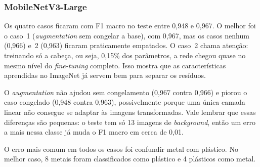\subsubsection{MobileNetV3-Large}

Os quatro casos ficaram com F1 macro no teste entre 0,948 e 0,967. O melhor
foi o caso~1 (\textit{augmentation} sem congelar a base), com 0,967, mas os
casos nenhum (0,966) e~2 (0,963) ficaram praticamente empatados. O caso~2
chama atenção: treinando só a cabeça, ou seja, 0,15\% dos parâmetros, a rede
chegou quase no mesmo nível do \textit{fine-tuning} completo. Isso mostra que
as características aprendidas no ImageNet já servem bem para separar os
resíduos.

O \textit{augmentation} não ajudou sem congelamento (0,967 contra 0,966) e
piorou o caso congelado (0,948 contra 0,963), possivelmente porque uma única
camada linear não consegue se adaptar às imagens transformadas. Vale lembrar
que essas diferenças são pequenas: o teste tem só 13 imagens de
\textit{background}, então um erro a mais nessa classe já muda o F1 macro em
cerca de 0,01.

O erro mais comum em todos os casos foi confundir metal com plástico. No
melhor caso, 8 metais foram classificados como plástico e 4 plásticos como
metal.
